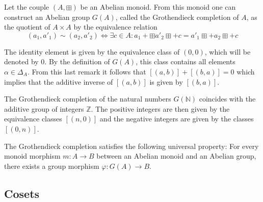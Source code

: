         \begin{construct}\label{group:grothendieck_completion}
		Let the couple $(A, \boxplus )$ be an Abelian monoid. From this monoid one can construct an Abelian group $G(A)$, called the Grothendieck completion of $A$, as the quotient of $A\times A$ by the equivalence relation
		\begin{equation}
			(a_1, a'_1)\sim (a_2, a'_2) \iff \exists c\in A: a_1 +\boxplus  a'_2 \boxplus + c = a'_1 \boxplus + a_2 \boxplus + c
		\end{equation}
		
		The identity element is given by the equivalence class of $(0, 0)$, which will be denoted by 0. By the definition of $G(A)$, this class contains all elements $\alpha\in\Delta_A$. From this last remark it follows that $[(a, b)] + [(b, a)] = 0$ which implies that the additive inverse of $[(a, b)]$ is given by $[(b, a)]$.
        \end{construct}
        
        \begin{example}
        	The Grothendieck completion of the natural numbers $G(\mathbb{N})$ coincides with the additive group of integers $\mathbb{Z}$. The positive integers are then given by the equivalence classes $[(n, 0)]$ and the negative integers are given by the classes $[(0, n)]$.
        \end{example}
        
        \begin{property}
        	The Grothendieck completion satisfies the following universal property: For every monoid morphism $m:A\rightarrow B$ between an Abelian monoid and an Abelian group, there exists a group morphism $\varphi:G(A)\rightarrow B$.
        \end{property}

\subsection{Cosets}

        
